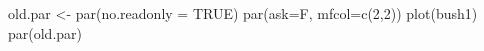\begin{Schunk}
\begin{Sinput}
 old.par <- par(no.readonly = TRUE)
 par(ask=F, mfcol=c(2,2))
 plot(bush1)
 par(old.par)
\end{Sinput}
\end{Schunk}
